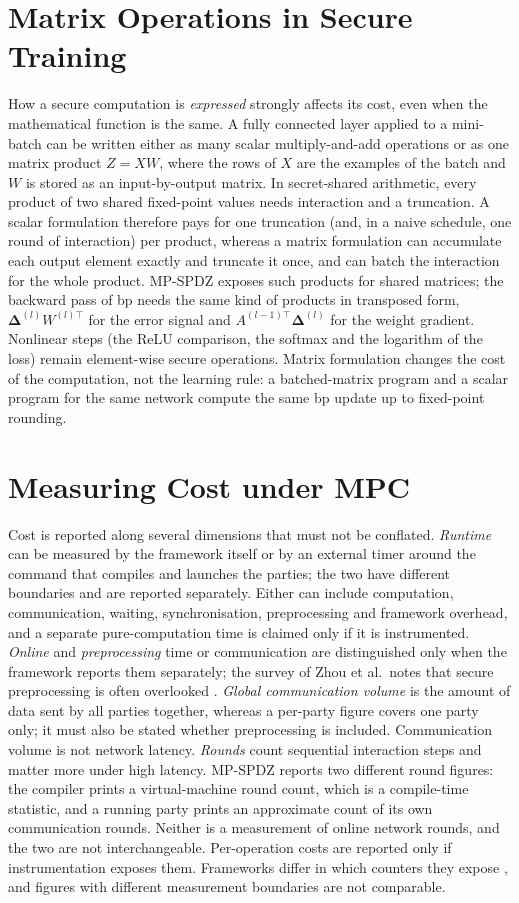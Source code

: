 \section{Matrix Operations in Secure Training}\label{sec:bg-matrix}
How a secure computation is \emph{expressed} strongly affects its cost, even when the mathematical function is the same. A fully connected layer applied to a mini-batch can be written either as many scalar multiply-and-add operations or as one matrix product $Z = XW$, where the rows of $X$ are the examples of the batch and $W$ is stored as an input-by-output matrix. In secret-shared arithmetic, every product of two shared fixed-point values needs interaction and a truncation. A scalar formulation therefore pays for one truncation (and, in a naive schedule, one round of interaction) per product, whereas a matrix formulation can accumulate each output element exactly and truncate it once, and can batch the interaction for the whole product. MP-SPDZ exposes such products for shared matrices; the backward pass of \ac{bp} needs the same kind of products in transposed form, $\boldsymbol{\Delta}^{(l)}W^{(l)\top}$ for the error signal and $A^{(l-1)\top}\boldsymbol{\Delta}^{(l)}$ for the weight gradient. Nonlinear steps (the ReLU comparison, the softmax and the logarithm of the loss) remain element-wise secure operations. Matrix formulation changes the cost of the computation, not the learning rule: a batched-matrix program and a scalar program for the same network compute the same \ac{bp} update up to fixed-point rounding.

\section{Measuring Cost under MPC}\label{sec:bg-cost}
Cost is reported along several dimensions that must not be conflated. \emph{Runtime} can be measured by the framework itself or by an external timer around the command that compiles and launches the parties; the two have different boundaries and are reported separately. Either can include computation, communication, waiting, synchronisation, preprocessing and framework overhead, and a separate pure-computation time is claimed only if it is instrumented. \emph{Online} and \emph{preprocessing} time or communication are distinguished only when the framework reports them separately; the survey of Zhou et al.\ notes that secure preprocessing is often overlooked \cite{zhou2024smpc}. \emph{Global communication volume} is the amount of data sent by all parties together, whereas a per-party figure covers one party only; it must also be stated whether preprocessing is included. Communication volume is not network latency. \emph{Rounds} count sequential interaction steps and matter more under high latency. MP-SPDZ reports two different round figures: the compiler prints a virtual-machine round count, which is a compile-time statistic, and a running party prints an approximate count of its own communication rounds. Neither is a measurement of online network rounds, and the two are not interchangeable. Per-operation costs are reported only if instrumentation exposes them. Frameworks differ in which counters they expose \cite{keller2020mpspdz}, and figures with different measurement boundaries are not comparable.

